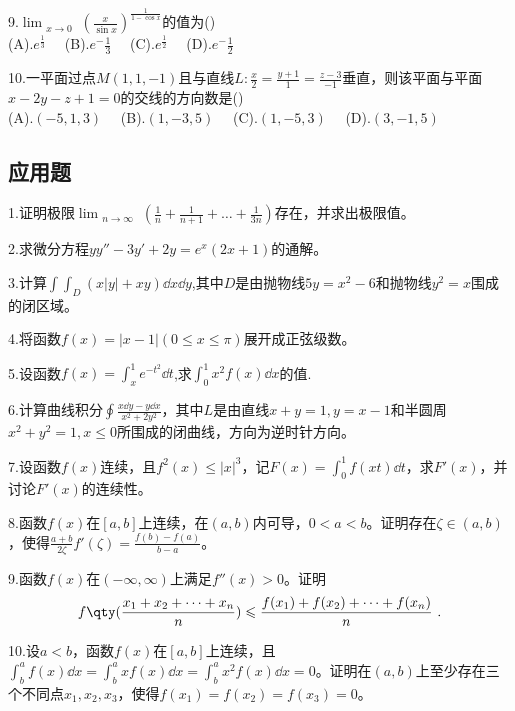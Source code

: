 9.$\displaystyle \lim_{\substack{x \to 0}} (\frac{x}{\sin x})^{\frac{1}{1-\cos x}}$的值为()\\
(A).$e^\frac{1}{3}\quad$     (B).$e^-\frac{1}{3}\quad$    (C).$e^\frac{1}{2}\quad$      (D).$e^-\frac{1}{2}\quad$

10.一平面过点$M(1,1,-1)$且与直线$L:\frac{x}{2}=\frac{y+1}{1}=\frac{z-3}{-1}$垂直，则该平面与平面$x-2y-z+1=0$的交线的方向数是()\\
(A).$(-5,1,3)\quad$  (B).$(1,-3,5)\quad$  (C).$(1,-5,3)\quad$   (D).$(3,-1,5)\quad$

\subsection{应用题}
1.证明极限$\displaystyle \lim_{\substack {n \to \infty}}(\frac{1}{n}+\frac{1}{n+1}+ \dots +\frac{1}{3n})$存在，并求出极限值。

2.求微分方程$yy''-3y'+2y=e^x(2x+1)$的通解。

3.计算$\int \int_{D}(x|y|+xy)\dd{x}\dd{y}$,其中$D$是由抛物线$5y=x^2-6$和抛物线$y^2=x$围成的闭区域。

4.将函数$f(x)=|x-1| (0\leqslant x \leqslant \pi)$展开成正弦级数。

5.设函数$f(x)=\int_{x}^{1}e^{-t^2}\dd{t}$,求$\int_{0}^{1}x^2f(x)\dd{x}$的值.

6.计算曲线积分$\oint \frac{x\dd{y}-y\dd{x}}{x^2+2y^2}$，其中$L$是由直线$x+y=1,y=x-1$和半圆周$x^2+y^2=1,x \leqslant 0$所围成的闭曲线，方向为逆时针方向。

7.设函数$f(x)$连续，且$f^2(x) \leqslant {|x|}^3$，记$F(x)=\int_{0}^{1}f(xt)\dd{t}$，求$F'(x)$，并讨论$F'(x)$的连续性。

8.函数$f(x)$在$[a,b]$上连续，在$(a,b)$内可导，$0<a<b$。证明存在$\zeta \in(a,b)$，使得$\frac{a+b}{2\zeta}f'(\zeta)=\frac{f(b)-f(a)}{b-a}$。

9.函数$f(x)$在$(-\infty,\infty)$上满足$f''(x)>0$。证明
\begin{equation}
f \qty (\frac{x_1+x_2+\dots+x_n}{n}) \leqslant \frac{f(x_1)+f(x_2)+\dots+f(x_n)}{n}~.
\end{equation}


10.设$a<b$，函数$f(x)$在$[a,b]$上连续，且$\int_{b}^{a}f(x)\dd{x}=\int_{b}^{a}xf(x)\dd{x}=\int_{b}^{a}x^2f(x)\dd{x}=0$。证明在$(a,b)$上至少存在三个不同点$x_1,x_2,x_3$，使得$f(x_1)=f(x_2)=f(x_3)=0$。
